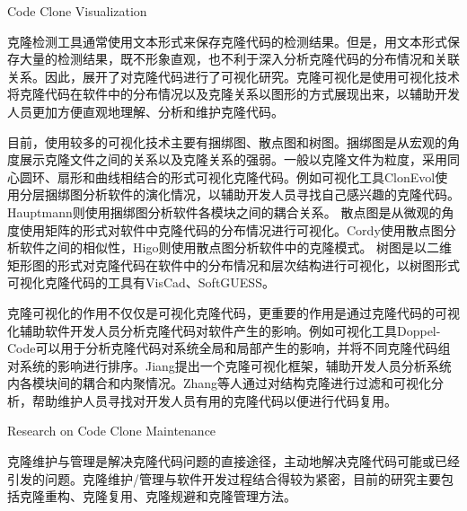 {Code Clone Visualization}

克隆检测工具通常使用文本形式来保存克隆代码的检测结果。但是，用文本形式保存大量的检测结果，既不形象直观，也不利于深入分析克隆代码的分布情况和关联关系。因此，展开了对克隆代码进行了可视化研究。克隆可视化是使用可视化技术将克隆代码在软件中的分布情况以及克隆关系以图形的方式展现出来，以辅助开发人员更加方便直观地理解、分析和维护克隆代码。

目前，使用较多的可视化技术主要有捆绑图、散点图和树图。捆绑图是从宏观的角度展示克隆文件之间的关系以及克隆关系的强弱。一般以克隆文件为粒度，采用同心圆环、扇形和曲线相结合的形式可视化克隆代码\cite{hanjalic2013clonevol,hauptmann2012using,voinea2014visual}。例如可视化工具ClonEvol使用分层捆绑图分析软件的演化情况，以辅助开发人员寻找自己感兴趣的克隆代码\cite{hanjalic2013clonevol}。Hauptmann则使用捆绑图分析软件各模块之间的耦合关系\cite{hauptmann2012using}。
散点图是从微观的角度使用矩阵的形式对软件中克隆代码的分布情况进行可视化\cite{cordy2011exploring,higo2007method,livieri2007very}。Cordy使用散点图分析软件之间的相似性\cite{cordy2011exploring}，Higo则使用散点图分析软件中的克隆模式\cite{higo2007method,livieri2007very}。
树图是以二维矩形图的形式对克隆代码在软件中的分布情况和层次结构进行可视化，以树图形式可视化克隆代码的工具有VisCad\cite{asaduzzaman2011viscad,uddin2015comprehension}、SoftGUESS\cite{adar2007softguess}。

克隆可视化的作用不仅仅是可视化克隆代码，更重要的作用是通过克隆代码的可视化辅助软件开发人员分析克隆代码对软件产生的影响。例如可视化工具Doppel-Code可以用于分析克隆代码对系统全局和局部产生的影响，并将不同克隆代码组对系统的影响进行排序\cite{forbes2012doppel}。Jiang提出一个克隆可视化框架，辅助开发人员分析系统内各模块间的耦合和内聚情况\cite{jiang2007framework,jiang2006visualizing}。Zhang等人通过对结构克隆进行过滤和可视化分析，帮助维护人员寻找对开发人员有用的克隆代码以便进行代码复用\cite{zhang2008query}。


{Research on Code Clone Maintenance}

克隆维护与管理是解决克隆代码问题的直接途径，主动地解决克隆代码可能或已经引发的问题。克隆维护/管理与软件开发过程结合得较为紧密，目前的研究主要包括克隆重构、克隆复用、克隆规避和克隆管理方法。

